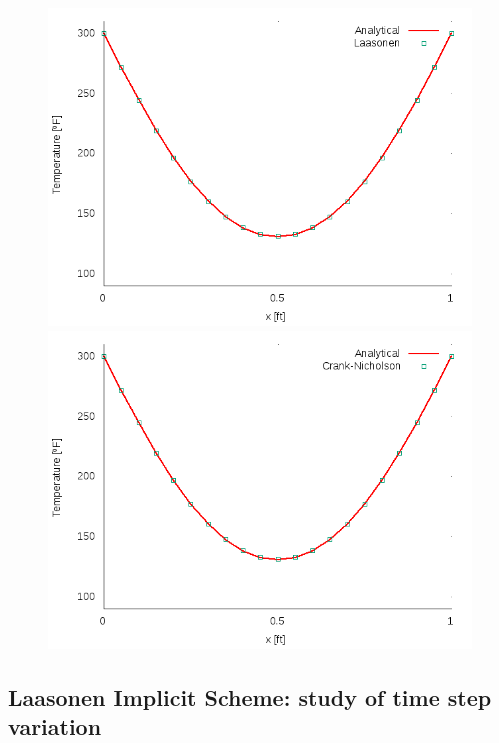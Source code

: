 \documentclass[12pt]{report}
\begin{document}
\begin{figure}[!htb]
\centering
\begin{minipage}{.5\textwidth}
  \centering
  \includegraphics[width=.8\linewidth]{Laasonent_0_4dt_0_010.png}
\end{minipage}%
\begin{minipage}{.5\textwidth}
  \centering
  \includegraphics[width=.8\linewidth]{Crank-Nicholsont_0_4.png}
\end{minipage}
\end{figure}

\subsection*{Laasonen Implicit Scheme: study of time step variation}
\end{document}

